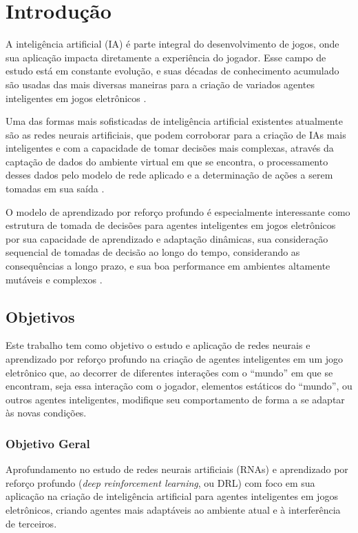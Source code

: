 
\chapter[Introdução]{Introdução}\label{capitulo1}

A inteligência artificial (IA) é parte integral do desenvolvimento de jogos, onde sua aplicação impacta diretamente a experiência do jogador. Esse campo de estudo está em constante evolução, e suas décadas de conhecimento acumulado são usadas das mais diversas maneiras para a criação de variados agentes inteligentes em jogos eletrônicos \cite{dill2015whatis}.

Uma das formas mais sofisticadas de inteligência artificial existentes atualmente são as redes neurais artificiais, que podem corroborar para a criação de IAs mais inteligentes e com a capacidade de tomar decisões mais complexas, através da captação de dados do ambiente virtual em que se encontra, o processamento desses dados pelo modelo de rede aplicado e a determinação de ações a serem tomadas em sua saída \cite{nielsen2015neural}.

O modelo de aprendizado por reforço profundo é especialmente interessante como estrutura de tomada de decisões para agentes inteligentes em jogos eletrônicos por sua capacidade de aprendizado e adaptação dinâmicas, sua consideração sequencial de tomadas de decisão ao longo do tempo, considerando as consequências a longo prazo, e sua boa performance em ambientes altamente mutáveis e complexos \cite{mnih2015human}.

\section{Objetivos}

Este trabalho tem como objetivo o estudo e aplicação de redes neurais e aprendizado por reforço profundo na criação de agentes inteligentes em um jogo eletrônico que, ao decorrer de diferentes interações com o “mundo” em que se encontram, seja essa interação com o jogador, elementos estáticos do “mundo”, ou outros agentes inteligentes, modifique seu comportamento de forma a se adaptar às novas condições.

\subsection{Objetivo Geral}

Aprofundamento no estudo de redes neurais artificiais (RNAs) e aprendizado por reforço profundo (\textit{deep reinforcement learning}, ou DRL) com foco em sua aplicação na criação de inteligência artificial para agentes inteligentes em jogos eletrônicos, criando agentes mais adaptáveis ao ambiente atual e à interferência de terceiros.

